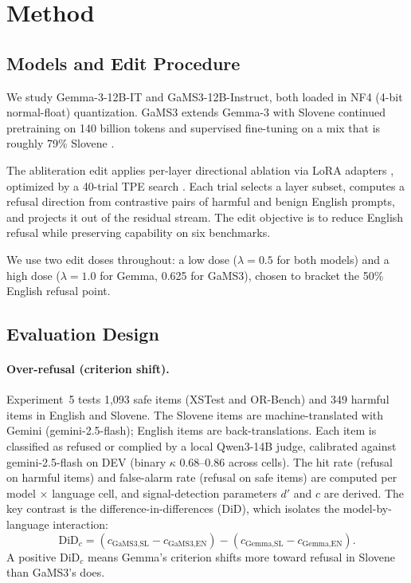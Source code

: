 \documentclass[11pt,letterpaper]{article}
\begin{document}
\section{Method}

\subsection{Models and Edit Procedure}

We study Gemma-3-12B-IT and GaMS3-12B-Instruct, both loaded in NF4 (4-bit normal-float) quantization.
GaMS3 extends Gemma-3 with Slovene continued pretraining on 140 billion tokens and supervised fine-tuning on a mix that is roughly 79\% Slovene \citep{Vres2026}.

The abliteration edit applies per-layer directional ablation via LoRA adapters \citep{Hu2021}, optimized by a 40-trial TPE search \citep{Akiba2019}.
Each trial selects a layer subset, computes a refusal direction from contrastive pairs of harmful and benign English prompts, and projects it out of the residual stream.
The edit objective is to reduce English refusal while preserving capability on six benchmarks.

We use two edit doses throughout: a low dose ($\lambda = 0.5$ for both models) and a high dose ($\lambda = 1.0$ for Gemma, 0.625 for GaMS3), chosen to bracket the 50\% English refusal point.

\subsection{Evaluation Design}

\paragraph{Over-refusal (criterion shift).}
Experiment~5 tests 1,093 safe items (XSTest \citep{Rottger2023} and OR-Bench) and 349 harmful items in English and Slovene.
The Slovene items are machine-translated with Gemini (gemini-2.5-flash); English items are back-translations.
Each item is classified as refused or complied by a local Qwen3-14B judge, calibrated against gemini-2.5-flash on DEV (binary $\kappa$ 0.68--0.86 across cells).
The hit rate (refusal on harmful items) and false-alarm rate (refusal on safe items) are computed per model $\times$ language cell, and signal-detection parameters $d'$ and $c$ are derived.
The key contrast is the difference-in-differences (DiD), which isolates the model-by-language interaction:
\begin{equation}
\mathrm{DiD}_c = (c_{\text{GaMS3,SL}} - c_{\text{GaMS3,EN}}) - (c_{\text{Gemma,SL}} - c_{\text{Gemma,EN}}).
\end{equation}
A positive $\mathrm{DiD}_c$ means Gemma's criterion shifts more toward refusal in Slovene than GaMS3's does.
\end{document}
